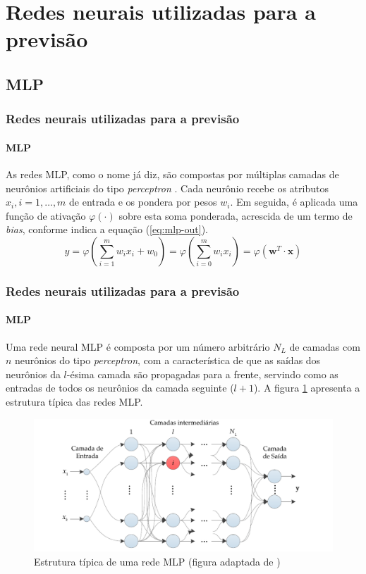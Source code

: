 \documentclass{beamer}
\begin{document}
\section{Redes neurais utilizadas para a previsão}

\subsection{MLP}

\begin{frame}
\frametitle{Redes neurais utilizadas para a previsão}
\framesubtitle{MLP}
\justifying As redes MLP, como o nome já diz, são compostas por múltiplas camadas de neurônios artificiais do tipo \textit{perceptron}  \cite{rosenblatt1958perceptron}. Cada neurônio recebe os atributos $x_i, i = 1, \ldots, m$ de entrada e os pondera por pesos $w_i$. Em seguida, é aplicada uma função de ativação $\varphi(\cdot)$ sobre esta soma ponderada, acrescida de um termo de \textit{bias}, conforme indica a equação (\ref{eq:mlp-out}).
\begin{equation}\label{eq:mlp-out}
y = \varphi  \left(\sum_{i=1}^{m}w_i x_i + w_0 \right) = \varphi \left(\sum_{i=0}^{m}w_i x_i \right) = \varphi \left(\mathbf{w}^T \cdot \mathbf{x} \right)
\end{equation}
\end{frame}

\begin{frame}
\frametitle{Redes neurais utilizadas para a previsão}
\framesubtitle{MLP}
\justifying Uma rede neural MLP é composta por um número arbitrário $N_L$ de  camadas com $n$ neurônios do tipo \textit{perceptron}, com a característica de que as saídas dos neurônios da $l$-ésima camada são propagadas para a frente, servindo como as entradas de todos os neurônios da camada seguinte ($l+1$). A figura \ref{fig:mlp-architecture} apresenta a estrutura típica das redes MLP.
\begin{figure}[H]
\centering
\includegraphics[scale = 0.3]{mlp-network.pdf}
\caption{Estrutura típica de uma rede MLP (figura adaptada de \cite{boccato2013novas}) }
\label{fig:mlp-architecture}
\end{figure}
\end{frame}
\end{document}
